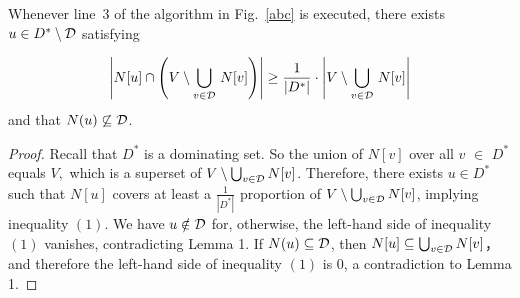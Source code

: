 \documentclass[12pt]{article}
\begin{document}
\begin{lemma}
Whenever line~3 of the algorithm in Fig.~\ref{abc} is executed,
there exists $u\in D^*\setminus {\cal D}$ satisfying

\begin{equation}
\left|N[u]\cap \left(V\setminus \bigcup_{v\in {\cal D}}\,N[v]\right)\right|
\ge \frac{1}{|D^*|}
\cdot\left|V\setminus \bigcup_{v\in {\cal D}}\,N[v]\right|
\label{lemma2-equation}
\end{equation}
and that $N(u)\not\subseteq {\cal D}$.
\end{lemma}

\begin{proof}
Recall that $D^*$ is a dominating set. So the union of $N[v]$ over all $v$ $\in$ $D^*$ equals $V, $ which is a superset of $V\setminus \bigcup_{v\in{\cal D}} N[v]$. Therefore, there exists $u\in D^*$ such that $N[u]$ covers at least a $\frac{1}{|D^*|}$ proportion of $V\setminus \bigcup_{v\in{\cal D}} N[v]$, implying inequality $(1)$. We have $u\notin {\cal D}$ for, otherwise, the left-hand side of inequality $(1)$ vanishes, contradicting Lemma 1.
If $N(u)\subseteq {\cal D}$,  then $N[u]\subseteq \bigcup_{v\in {\cal D}} N[v]$， and therefore the left-hand side of inequality $(1)$ is 0, a contradiction to Lemma 1.
\end{proof}



\clearpage
\end{document}
